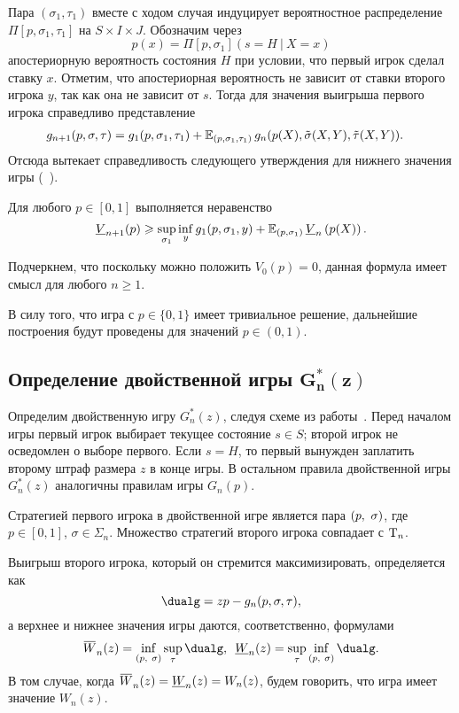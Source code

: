 {Пара $(\sigma_1, \tau_1)$ вместе с ходом случая индуцирует вероятностное распределение $\Pi[p, \sigma_1, \tau_1]$ на $S \times I \times J$.
Обозначим через
\[
  p(x) = \Pi[p, \sigma_1](s = H\ |\ X = x)
\]
апостериорную вероятность состояния $H$ при условии, что первый игрок сделал ставку $x$.
Отметим, что апостериорная вероятность не зависит от ставки второго игрока $y$, так как она не зависит от $s$.
Тогда для значения выигрыша первого игрока справедливо представление
\begin{align*}
  g_{n+1}(p, \sigma, \tau) 
  &= 
    g_1(p, \sigma_1, \tau_1) +
    \operatorname{\mathbb{E}}_{( p, \sigma_1, \tau_1 )}
    g_n(p(X), \tilde{\sigma}(X, Y), \tilde{\tau}(X, Y)).
\end{align*}
Отсюда вытекает справедливость следующего утверждения для нижнего значения игры (\seename~\cite{demeyer02}).
\begin{lemma}
  \label{ch3:lem:low-bound-primal}
  Для любого $p \in [0, 1]$ выполняется неравенство
  \begin{equation}
    \LV{n+1}(p) \geqslant \sup_{\sigma_1} \inf_{y} g_1(p, \sigma_1, y)
    + \E_{( p, \sigma_1 )} \LV{n}\left( p(X) \right).
  \end{equation}
\end{lemma}
Подчеркнем, что поскольку можно положить $V_0(p) = 0$, данная формула имеет смысл для любого $n \geqslant 1$.

В силу того, что игра с $p \in \{0, 1\}$ имеет тривиальное решение, дальнейшие построения будут проведены для значений $p \in (0, 1)$.

\subsection{Определение двойственной игры $\mathbf{ G^{*}_{n}(z) }$}
Определим двойственную игру $G^*_n(z)$, следуя схеме из работы~\cite{demeyer02}.
Перед началом игры первый игрок выбирает текущее состояние $s \in S$; второй игрок не осведомлен о выборе первого.
Если $s = H$, то первый вынужден заплатить второму штраф размера $z$ в конце игры.
В остальном правила двойственной игры $G^*_n(z)$ аналогичны правилам игры $G_n(p)$.

Стратегией первого игрока в двойственной игре является пара $(p,\ \sigma)$, где $p \in [0, 1]$, $\sigma \in \Sigma_n$.
Множество стратегий второго игрока совпадает с $\mathrm{T}_n$.

Выигрыш второго игрока, который он стремится максимизировать, определяется как
\begin{equation*}
  \dualg = z p - g_n(p, \sigma, \tau),
\end{equation*}
а верхнее и нижнее значения игры даются, соответственно, формулами
\begin{equation*}
  \HW{n}(z) = \inf_{\dualFPS} \sup_\tau \dualg, \enskip
  \LW{n}(z) = \sup_\tau \inf_{\dualFPS} \dualg.
\end{equation*}
В том случае, когда $\HW{n}(z) = \LW{n}(z) = W_n(z)$, будем говорить, что игра имеет значение $W_n(z)$.

}
